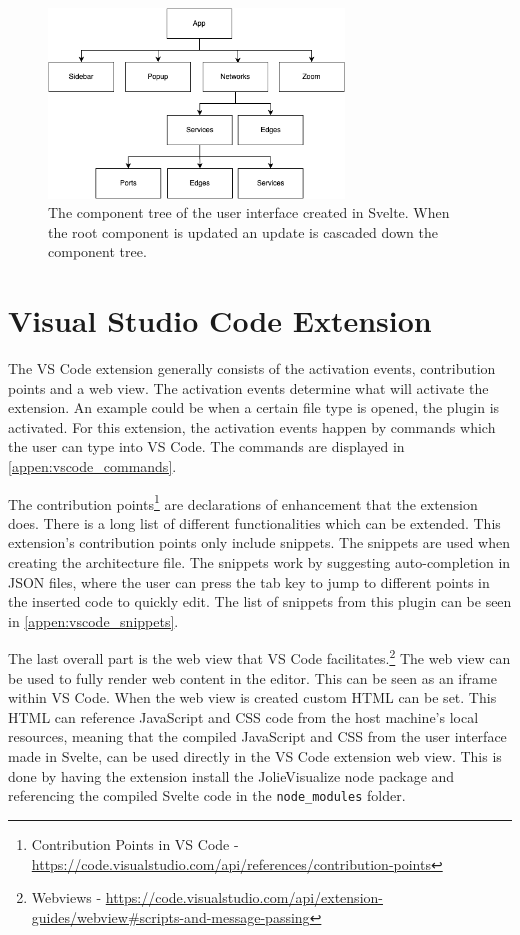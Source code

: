 \begin{figure}[t]
    \center
    \includegraphics[width=0.70\textwidth]{figures/component_tree.png}
    \caption{The component tree of the user interface created in Svelte. When the root component is updated an update is cascaded down the component tree.}
    \label{figure:component_tree}
\end{figure}

\section{Visual Studio Code Extension}
The VS Code extension generally consists of the activation events, contribution points and a web view.
The activation events determine what will activate the extension. An example could be when a certain file type is opened, the plugin is activated.
For this extension, the activation events happen by commands which the user can type into VS Code. The commands are displayed in \cref{appen:vscode_commands}.

The contribution points\footnote{Contribution Points in VS Code - \url{https://code.visualstudio.com/api/references/contribution-points}} are declarations of enhancement that the extension does. There is a long list of different functionalities which can be extended.
This extension's contribution points only include snippets. The snippets are used when creating the architecture file. The snippets work by suggesting auto-completion in JSON files, where the user can press the tab key to jump to different points in the inserted code to quickly edit.
The list of snippets from this plugin can be seen in \cref{appen:vscode_snippets}.

The last overall part is the web view that VS Code facilitates.\footnote{Webviews - \url{https://code.visualstudio.com/api/extension-guides/webview\#scripts-and-message-passing}} The web view can be used to fully render web content in the editor.
This can be seen as an iframe within VS Code. When the web view is created custom HTML can be set. This HTML can reference JavaScript and CSS code from the host machine's local resources, meaning that the compiled JavaScript and CSS from the user interface made in Svelte, can be used directly in the VS Code extension web view.
This is done by having the extension install the JolieVisualize node package and referencing the compiled Svelte code in the \texttt{node\_modules} folder.

